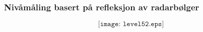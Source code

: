 \documentclass[aspectratio=169,xcolor=dvipsnames]{beamer}
\begin{document}
%
%
%
\begin{frame}
	\frametitle{Nivåmåling basert på refleksjon av radarbølger}

$$\texttt{[image: level52.eps]}$$
\end{frame}
%
%
%
\end{document}
